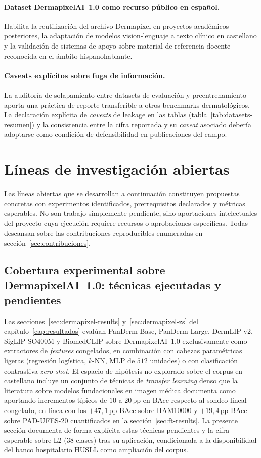 \paragraph{Dataset DermapixelAI~1.0 como recurso público en español.}
Habilita la reutilización del archivo Dermapixel en proyectos
académicos posteriores, la adaptación de modelos vision-lenguaje a
texto clínico en castellano y la validación de sistemas de apoyo
sobre material de referencia docente reconocida en el ámbito
hispanohablante.

\paragraph{Caveats explícitos sobre fuga de información.}
La auditoría de solapamiento entre datasets de evaluación y
preentrenamiento aporta una práctica de reporte transferible a
otros benchmarks dermatológicos. La declaración explícita de
\emph{caveats} de leakage en las tablas
(tabla~\ref{tab:datasets-resumen}) y la consistencia entre la cifra
reportada y su \emph{caveat} asociado debería adoptarse como
condición de defensibilidad en publicaciones del campo.

\section{Líneas de investigación abiertas}
\label{sec:lineas-abiertas}

Las líneas abiertas que se desarrollan a continuación constituyen
propuestas concretas con experimentos identificados, prerrequisitos
declarados y métricas esperables. No son trabajo simplemente
pendiente, sino aportaciones intelectuales del proyecto cuya
ejecución requiere recursos o aprobaciones específicas. Todas
descansan sobre las contribuciones reproducibles enumeradas en
secci\'on~\ref{sec:contribuciones}.

\subsection{Cobertura experimental sobre DermapixelAI~1.0: técnicas ejecutadas y pendientes}
\label{sec:dermapixel-futuro}

Las secciones~\ref{sec:dermapixel-results}
y~\ref{sec:dermapixel-zs} del capítulo~\ref{cap:resultados} evalúan
PanDerm Base, PanDerm Large, DermLIP v2, SigLIP-SO400M y BiomedCLIP
sobre DermapixelAI~1.0 exclusivamente como extractores de
\emph{features} congelados, en combinación con cabezas paramétricas
ligeras (regresión logística, $k$-NN, MLP de $512$ unidades) o con
clasificación contrastiva \emph{zero-shot}. El espacio de hipótesis
no explorado sobre el corpus en castellano incluye un conjunto de
técnicas de \emph{transfer learning} denso que la literatura sobre
modelos fundacionales en imagen médica documenta como aportando
incrementos típicos de $10$ a $20$\,pp en BAcc respecto al sondeo
lineal congelado, en línea con los $+47{,}1$\,pp BAcc sobre
HAM10000 y $+19{,}4$\,pp BAcc sobre PAD-UFES-20 cuantificados en
la secci\'on~\ref{sec:ft-results}. La presente sección documenta de
forma explícita estas técnicas pendientes y la cifra esperable
sobre L2 (38 clases) tras su aplicación, condicionada a la
disponibilidad del banco hospitalario HUSLL como ampliación del
corpus.

